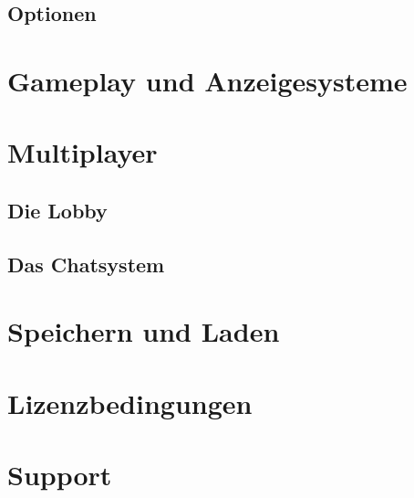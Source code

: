 \documentclass[12pt, a4paper]{scrreprt}
\begin{document}
\section{Optionen}
\chapter{Gameplay und Anzeigesysteme}
\chapter{Multiplayer}
\section{Die Lobby}
\section{Das Chatsystem}
\chapter{Speichern und Laden}
\chapter{Lizenzbedingungen}
\chapter{Support}
\end{document}
